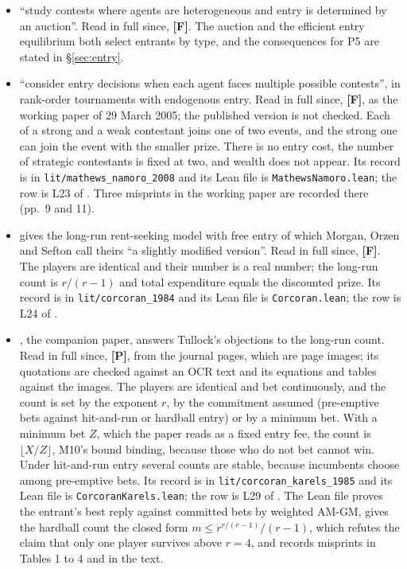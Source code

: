 \documentclass[11pt,a4paper]{article}
\begin{document}
\begin{itemize}
\item \citet{FullertonMcAfee1999} ``study contests where agents are
  heterogeneous and entry is determined by an auction''. Read in full since,
  \textbf{[F]}. The auction and the efficient entry equilibrium both select
  entrants by type, and the consequences for P5 are stated in
  \S\ref{sec:entry}.
\item \citet{MathewsNamoro2008} ``consider entry decisions when each agent faces
  multiple possible contests'', in rank-order tournaments with endogenous
  entry. Read in full since, \textbf{[F]}, as the working paper of 29 March
  2005; the published version is not checked. Each of a strong and a weak
  contestant joins one of two events, and the strong one can join the event
  with the smaller prize. There is no entry cost, the number of strategic
  contestants is fixed at two, and wealth does not appear. Its record is in
  \texttt{lit/mathews\_namoro\_2008} and its Lean file is
  \texttt{MathewsNamoro.lean}; the row is L23 of . Three
  misprints in the working paper are recorded there (pp.~9 and 11).
\item \citet{Corcoran1984} gives the long-run rent-seeking model with free
  entry of which Morgan, Orzen and Sefton call theirs ``a slightly modified
  version''. Read in full since, \textbf{[F]}. The players are identical and
  their number is a real number; the long-run count is $r/(r-1)$ and total
  expenditure equals the discounted prize. Its record is in
  \texttt{lit/corcoran\_1984} and its Lean file is \texttt{Corcoran.lean}; the
  row is L24 of .
\item \citet{CorcoranKarels1985}, the companion paper, answers Tullock's
  objections to the long-run count. Read in full since, \textbf{[P]}, from the
  journal pages, which are page images; its quotations are checked against an
  OCR text and its equations and tables against the images. The players are
  identical and bet continuously, and the count is set by the exponent $r$, by
  the commitment assumed (pre-emptive bets against hit-and-run or hardball
  entry) or by a minimum bet. With a minimum bet $Z$, which the paper reads as a
  fixed entry fee, the count is $\lfloor X/Z\rfloor$, M10's bound binding,
  because those who do not bet cannot win. Under hit-and-run entry several
  counts are stable, because incumbents choose among pre-emptive bets. Its
  record is in \texttt{lit/corcoran\_karels\_1985} and its Lean file is
  \texttt{CorcoranKarels.lean}; the row is L29 of . The
  Lean file proves the entrant's best reply against committed bets by weighted
  AM-GM, gives the hardball count the closed form $m\le r^{r/(r-1)}/(r-1)$,
  which refutes the claim that only one player survives above $r=4$, and
  records misprints in Tables 1 to 4 and in the text.
\end{itemize}
\end{document}
